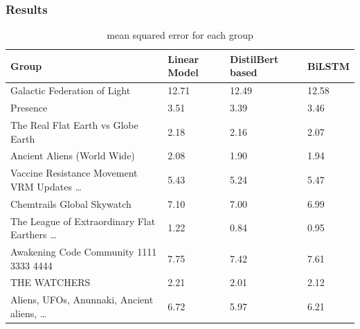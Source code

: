 \documentclass[notes]{tum-presentation}
\begin{document}
\begin{frame}
  \frametitle{Results}
\begin{table}[tb]
    \caption{mean squared error for each group}
    \label{tab:result-mse-per-group}
    \centering
    \begin{tabular}{l|l|l|l}
        Group & Linear Model & DistilBert based & BiLSTM \\
        \hline
        \hline
        Galactic Federation of Light & 12.71 & 12.49 & 12.58\\
        Presence & 3.51 & 3.39 & 3.46\\
        The Real Flat Earth vs Globe Earth & 2.18 & 2.16 & 2.07\\
        Ancient Aliens (World Wide) & 2.08 & 1.90 & 1.94\\
        Vaccine Resistance Movement VRM Updates \dots & 5.43 & 5.24 & 5.47\\
        Chemtrails Global Skywatch & 7.10 & 7.00 & 6.99\\
        The League of Extraordinary Flat Earthers \dots & 1.22 & 0.84 & 0.95\\
        Awakening Code Community 1111 3333 4444 & 7.75 & 7.42 & 7.61\\
        THE WATCHERS & 2.21 & 2.01 & 2.12\\
        Aliens, UFOs, Anunnaki, Ancient aliens, \dots & 6.72 & 5.97 & 6.21\\
    \end{tabular}
\end{table}
\end{frame}
\end{document}
